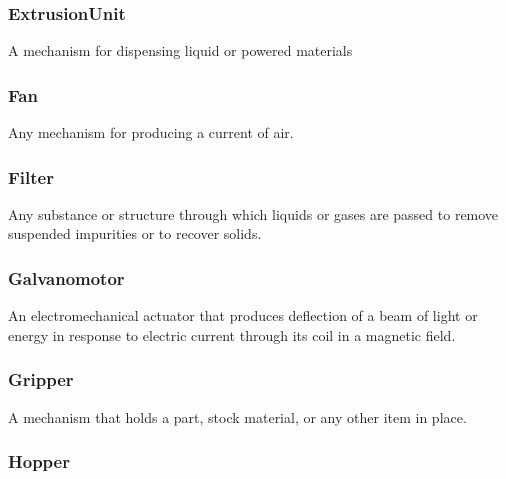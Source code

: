 \subsubsection{ExtrusionUnit}
  \label{sec:ExtrusionUnit}



A mechanism for dispensing liquid or powered materials

\FloatBarrier

\subsubsection{Fan}
  \label{sec:Fan}



Any mechanism for producing a current of air.

\FloatBarrier

\subsubsection{Filter}
  \label{sec:Filter}



Any substance or structure through which liquids or gases are passed to remove suspended impurities or to recover solids.

\FloatBarrier

\subsubsection{Galvanomotor}
  \label{sec:Galvanomotor}



An electromechanical actuator that produces deflection of a beam of light or energy in response to electric current through its coil in a magnetic field.

\FloatBarrier

\subsubsection{Gripper}
  \label{sec:Gripper}



A mechanism that holds a part, stock material, or any other item in place.

\FloatBarrier

\subsubsection{Hopper}
  \label{sec:Hopper}



